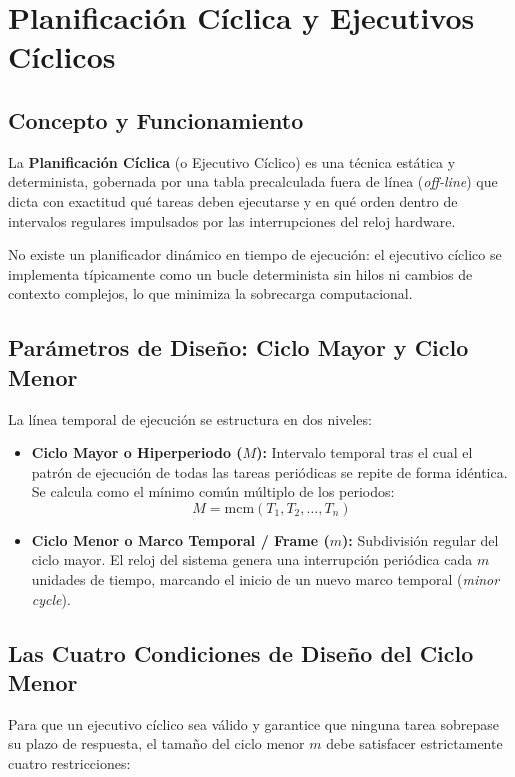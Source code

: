 \section{Planificación Cíclica y Ejecutivos Cíclicos}

\subsection{Concepto y Funcionamiento}
La \textbf{Planificación Cíclica} (o Ejecutivo Cíclico) es una técnica estática y determinista, gobernada por una tabla precalculada fuera de línea (\textit{off-line}) que dicta con exactitud qué tareas deben ejecutarse y en qué orden dentro de intervalos regulares impulsados por las interrupciones del reloj hardware.

No existe un planificador dinámico en tiempo de ejecución: el ejecutivo cíclico se implementa típicamente como un bucle determinista sin hilos ni cambios de contexto complejos, lo que minimiza la sobrecarga computacional.

\subsection{Parámetros de Diseño: Ciclo Mayor y Ciclo Menor}
La línea temporal de ejecución se estructura en dos niveles:
\begin{itemize}[leftmargin=*]
    \item \textbf{Ciclo Mayor o Hiperperiodo ($M$):} Intervalo temporal tras el cual el patrón de ejecución de todas las tareas periódicas se repite de forma idéntica. Se calcula como el mínimo común múltiplo de los periodos:
    \begin{equation}
    M = \text{mcm}(T_1, T_2, \dots, T_n)
    \end{equation}
    \item \textbf{Ciclo Menor o Marco Temporal / Frame ($m$):} Subdivisión regular del ciclo mayor. El reloj del sistema genera una interrupción periódica cada $m$ unidades de tiempo, marcando el inicio de un nuevo marco temporal (\textit{minor cycle}).
\end{itemize}

\subsection{Las Cuatro Condiciones de Diseño del Ciclo Menor}
Para que un ejecutivo cíclico sea válido y garantice que ninguna tarea sobrepase su plazo de respuesta, el tamaño del ciclo menor $m$ debe satisfacer estrictamente cuatro restricciones:

